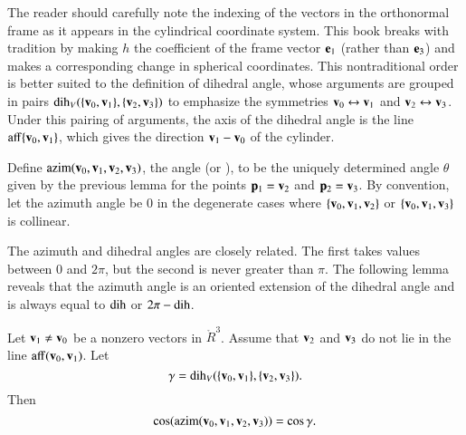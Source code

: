\begin{remark}
The reader should carefully note the indexing of the vectors in the
orthonormal frame as it appears in the cylindrical coordinate system.
This book breaks with tradition by making $h$ the coefficient of the
frame vector ${\mathbf e}_1$ (rather than ${\mathbf e}_3$) and makes a corresponding
change in spherical coordinates.  This nontraditional order is better
suited to the definition of dihedral angle, whose
arguments are grouped in pairs $\operatorname{dih}_V(\{{\mathbf v}_0,{\mathbf v}_1\},\{{\mathbf v}_2,{\mathbf v}_3\})$
to emphasize the symmetries
${\mathbf v}_0\leftrightarrow{\mathbf v}_1$ and ${\mathbf v}_2\leftrightarrow{\mathbf v}_3$.  Under this pairing
of arguments, the axis of the dihedral angle is the line
${\operatorname{aff}}\{{\mathbf v}_0,{\mathbf v}_1\}$, which gives the direction ${\mathbf v}_1-{\mathbf v}_0$ of the cylinder.
%
%
\end{remark}

\begin{definition}[azim]
  Define ${\operatorname{azim}}({\mathbf v}_0,{\mathbf v}_1,{\mathbf v}_2,{\mathbf v}_3)$, the  angle
  (or ), to be the uniquely determined angle
  $\theta$  given by the previous lemma for the points ${\mathbf p}_1={\mathbf v}_2$ and ${\mathbf p}_2={\mathbf v}_3$.
  By convention, let the azimuth angle be $0$ in the degenerate cases
  where $\{{\mathbf v}_0,{\mathbf v}_1,{\mathbf v}_2\}$ or $\{{\mathbf v}_0,{\mathbf v}_1,{\mathbf v}_3\}$ is collinear.
\end{definition}


The azimuth and dihedral angles are closely related.  The first
 takes values between $0$ and $2\pi$, but the second is
never greater than $\pi$.  The following lemma reveals that the
azimuth angle is an oriented extension of the dihedral angle and is always
equal to $\operatorname{dih}$ or $2\pi - \operatorname{dih}$.  %
%
%
%

\begin{lemma}[]\label{lemma:dih-azim}
     Let
  ${\mathbf v}_1\ne {\mathbf v}_0$ be a nonzero vectors in $\ring{R}^3$.  Assume that
  ${\mathbf v}_2$ and ${\mathbf v}_3$ do not lie in the line ${\operatorname{aff}}({\mathbf v}_0,{\mathbf v}_1)$.  Let
\begin{displaymath}
\gamma = \operatorname{dih}_V(\{{\mathbf v}_0,{\mathbf v}_1\},\{{\mathbf v}_2,{\mathbf v}_3\}).
\end{displaymath}
Then
\begin{displaymath}
\cos({\operatorname{azim}}({\mathbf v}_0,{\mathbf v}_1,{\mathbf v}_2,{\mathbf v}_3)) = \cos\gamma.
\end{displaymath}
\end{lemma}

